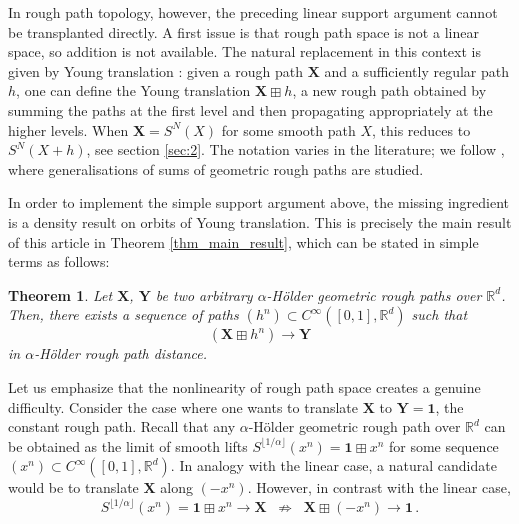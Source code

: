 \documentclass[12pt,a4paper]{article}
\numberwithin{equation}{section}
\theoremstyle{plain}
\newtheorem{theorem}{Theorem}[section]
\theoremstyle{definition}
\theoremstyle{remark}
\begin{document}
In rough path topology, however, the preceding linear support argument cannot be
transplanted directly. A first issue is that rough path space is not a linear space,
so addition is not available. The natural replacement in this context is given by
Young translation \cite{frizbook}: given a rough path $\mathbf{X}$ and a sufficiently
regular path $h$, one can define the Young translation $\mathbf{X} \boxplus h$, a new rough path obtained by summing the paths at the first level and then propagating appropriately at the
higher levels. When $\mathbf{X}=S^N(X)$ for some smooth path $X$, this reduces to $S^N(X + h)$, see section \ref{sec:2}. The notation varies in the literature; we follow \cite{Bel22}, where
generalisations of sums of geometric rough paths are studied.


In order to implement the simple support argument above, the missing ingredient is a density result on orbits of Young translation. This is precisely the main result of this article in Theorem \ref{thm_main_result}, which can be stated in simple terms as follows:
\begin{theorem}\label{thm_main}
	Let $\mathbf X$, $\mathbf Y$ be two arbitrary $\alpha$-H\"older geometric rough paths over $\mathbb R^d$. Then, there exists a sequence of paths $(h^n)\subset C^{\infty}([0,1],\mathbb R^d)$ such that 
	\begin{equation}\label{eq:main_conv}
(\mathbf X\boxplus h^n)\rightarrow \mathbf Y
	\end{equation}
	 in  $\alpha$-H\"older rough path distance.
	 \end{theorem}
	 

Let us emphasize that the nonlinearity of rough path space creates a genuine 
difficulty. Consider the case where one wants to translate $\mathbf{X}$ to 
$\mathbf{Y} = \mathbf{1}$, the constant rough path. Recall that any 
$\alpha$-H\"older geometric rough path over $\mathbb{R}^d$ can be obtained as 
the limit of smooth lifts $S^{\lfloor 1/\alpha \rfloor}(x^n) = \mathbf{1} 
\boxplus x^n$ for some sequence $(x^n) \subset C^{\infty}([0,1], \mathbb{R}^d)$. 
In analogy with the linear case, a natural candidate would be to translate 
$\mathbf{X}$ along $(-x^n)$. However, in contrast with the linear case, 
\[
S^{\lfloor 1/\alpha \rfloor}(x^n) = \mathbf{1} \boxplus x^n \to \mathbf{X}
\;\;\not\Rightarrow\;\;
\mathbf{X} \boxplus (-x^n) \to \mathbf{1}\,.
\]
\end{document}
